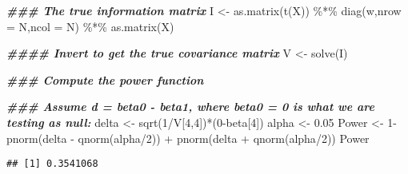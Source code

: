 \documentclass[
]{article}
\newenvironment{Shaded}{\begin{snugshade}}{\end{snugshade}}
\newcommand{\AttributeTok}[1]{\textcolor[rgb]{0.77,0.63,0.00}{#1}}
\newcommand{\DecValTok}[1]{\textcolor[rgb]{0.00,0.00,0.81}{#1}}
\newcommand{\DocumentationTok}[1]{\textcolor[rgb]{0.56,0.35,0.01}{\textbf{\textit{#1}}}}
\newcommand{\FloatTok}[1]{\textcolor[rgb]{0.00,0.00,0.81}{#1}}
\newcommand{\FunctionTok}[1]{\textcolor[rgb]{0.00,0.00,0.00}{#1}}
\newcommand{\NormalTok}[1]{#1}
\newcommand{\OtherTok}[1]{\textcolor[rgb]{0.56,0.35,0.01}{#1}}
\newcommand{\SpecialCharTok}[1]{\textcolor[rgb]{0.00,0.00,0.00}{#1}}
\begin{document}
\begin{Shaded}
\begin{Highlighting}[]
\DocumentationTok{\#\#\# The true information matrix}
\NormalTok{I }\OtherTok{\textless{}{-}} \FunctionTok{as.matrix}\NormalTok{(}\FunctionTok{t}\NormalTok{(X)) }\SpecialCharTok{\%*\%} \FunctionTok{diag}\NormalTok{(w,}\AttributeTok{nrow =}\NormalTok{ N,}\AttributeTok{ncol =}\NormalTok{ N) }\SpecialCharTok{\%*\%} \FunctionTok{as.matrix}\NormalTok{(X)}



\DocumentationTok{\#\#\#\# Invert to get the true covariance matrix }
\NormalTok{V }\OtherTok{\textless{}{-}} \FunctionTok{solve}\NormalTok{(I)}



\DocumentationTok{\#\#\# Compute the power function }

\DocumentationTok{\#\#\# Assume d = beta0 {-} beta1, where beta0 = 0 is what we are testing as null:}
\NormalTok{delta }\OtherTok{\textless{}{-}} \FunctionTok{sqrt}\NormalTok{(}\DecValTok{1}\SpecialCharTok{/}\NormalTok{V[}\DecValTok{4}\NormalTok{,}\DecValTok{4}\NormalTok{])}\SpecialCharTok{*}\NormalTok{(}\DecValTok{0}\SpecialCharTok{{-}}\NormalTok{beta[}\DecValTok{4}\NormalTok{])}
\NormalTok{alpha }\OtherTok{\textless{}{-}} \FloatTok{0.05}
\NormalTok{Power }\OtherTok{\textless{}{-}} \DecValTok{1}\SpecialCharTok{{-}} \FunctionTok{pnorm}\NormalTok{(delta }\SpecialCharTok{{-}} \FunctionTok{qnorm}\NormalTok{(alpha}\SpecialCharTok{/}\DecValTok{2}\NormalTok{)) }\SpecialCharTok{+} \FunctionTok{pnorm}\NormalTok{(delta }\SpecialCharTok{+} \FunctionTok{qnorm}\NormalTok{(alpha}\SpecialCharTok{/}\DecValTok{2}\NormalTok{))}
\NormalTok{Power}
\end{Highlighting}
\end{Shaded}

\begin{verbatim}
## [1] 0.3541068
\end{verbatim}
\end{document}
